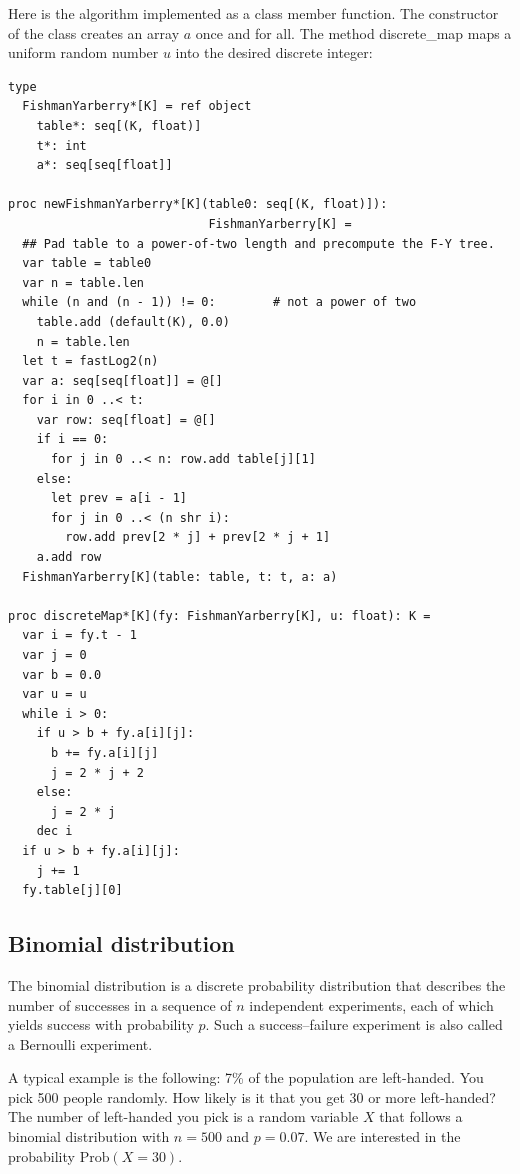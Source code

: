 \documentclass[justified, sixbynine]{tufte-book}
\theoremstyle{plain}%
\newtheorem * {corollary}{Corollary}
\theoremstyle{definition}
\theoremstyle{remark}
\newtheorem * {remark}{Remark}
\newtheorem * {note}{Note}
\begin{document}
\begin{fullwidth}
Here is the algorithm implemented as a class member function. The
constructor of the class creates an array $a$ once and for all. The method
discrete\_map maps a uniform random number $u$ into the desired discrete
integer:


\begin{lstlisting}
type
  FishmanYarberry*[K] = ref object
    table*: seq[(K, float)]
    t*: int
    a*: seq[seq[float]]

proc newFishmanYarberry*[K](table0: seq[(K, float)]):
                            FishmanYarberry[K] =
  ## Pad table to a power-of-two length and precompute the F-Y tree.
  var table = table0
  var n = table.len
  while (n and (n - 1)) != 0:        # not a power of two
    table.add (default(K), 0.0)
    n = table.len
  let t = fastLog2(n)
  var a: seq[seq[float]] = @[]
  for i in 0 ..< t:
    var row: seq[float] = @[]
    if i == 0:
      for j in 0 ..< n: row.add table[j][1]
    else:
      let prev = a[i - 1]
      for j in 0 ..< (n shr i):
        row.add prev[2 * j] + prev[2 * j + 1]
    a.add row
  FishmanYarberry[K](table: table, t: t, a: a)

proc discreteMap*[K](fy: FishmanYarberry[K], u: float): K =
  var i = fy.t - 1
  var j = 0
  var b = 0.0
  var u = u
  while i > 0:
    if u > b + fy.a[i][j]:
      b += fy.a[i][j]
      j = 2 * j + 2
    else:
      j = 2 * j
    dec i
  if u > b + fy.a[i][j]:
    j += 1
  fy.table[j][0]
\end{lstlisting}

\goodbreak\subsection{Binomial distribution}


The binomial distribution is a discrete probability distribution that
describes the number of successes in a sequence of $n$ independent
experiments, each of which yields success with probability $p$. Such a
success--failure experiment is also called a Bernoulli experiment.

A typical example is the following: 7\% of the population are left-handed.
You pick 500 people randomly. How likely is it that you get 30 or more
left-handed? The number of left-handed you pick is a random variable $X$
that follows a binomial distribution with $n=500$ and $p=0.07$. We are
interested in the probability $\textrm{Prob}(X=30)$.


\end{fullwidth}
\end{document}
